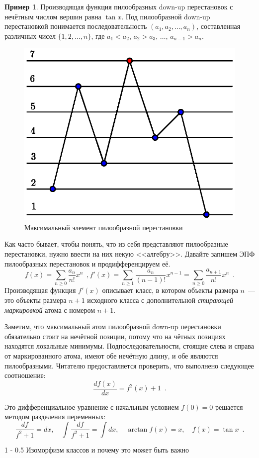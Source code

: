 \documentclass[a5paper]{article}
\makeatletter
\theoremstyle{definition}
\newtheorem{example}{Пример}
\renewcommand{\section}{\@startsection
{section}%
{1}%
{\z@}%
{-\baselineskip}%
{0.5\baselineskip}%
{\centering\large\scshape}} %
\makeatother
\begin{document}
\begin{example}
Производящая функция пилообразных down-up перестановок с нечётным числом вершин 
равна \( \tan x \). Под пилообразной down-up перестановкой понимается 
последовательность \( (a_1, a_2, \ldots, a_n) \), составленная различных чисел 
\( \{ 1, 2, \ldots, n \} \), где \( a_1 < a_2 \), \( a_2 > a_3 \), \( \ldots 
\), \( a_{n-1} > a_n \).

\begin{figure}[h]
\centering
	\includegraphics[width=.42\textwidth]{saw_permutation}
\caption{Максимальный элемент пилообразной перестановки}
\label{fig:saw_permutations}	
\end{figure}
	
Как часто бывает, чтобы понять, что из себя представляют пилообразные 
перестановки, нужно ввести на них некую <<алгебру>>. Давайте запишем ЭПФ 
пилообразных перестановок и продифференцируем её.
\[
	f(x) = \sum_{n \geq 0} \dfrac{a_n}{n!} x^n \enspace ,
	f'(x) = \sum_{n \geq 1} \dfrac{a_n}{(n-1)!} x^{n-1} = \sum_{n \geq 0} 
	\dfrac{a_{n+1}}{n!}x^{n}\enspace .
\]
Производящая функция \( f'(x) \) описывает класс, в котором объекты размера \( 
n \)~--- это объекты размера \( n+1 \) исходного класса с дополнительной 
\textit{стирающей маркировкой} атома с номером \( n+1 \). 

Заметим, что максимальный атом пилообразной down-up перестановки обязательно 
стоит на нечётной позиции, потому что на чётных позициях находятся локальные 
минимумы. Подпоследовательности, стоящие слева и справа от маркированного 
атома, имеют обе нечётную длину, и обе являются пилообразными. Читателю 
предоставляется проверить, что выполнено следующее соотношение:
\[
	\dfrac{df(x)}{dx} = f^2(x) + 1 \enspace .
\]
\end{example}
Это дифференциальное уравнение с начальным условием \( f(0) = 0 \) решается 
методом разделения переменных:
\[
	\dfrac{df}{f^2 + 1} = dx, \quad
	\int \dfrac{df}{f^2 + 1} = \int dx, \quad
	\arctan f(x) = x, \quad
	f(x) = \tan x \enspace .
\]

\section{Изоморфизм классов и почему это может быть важно}
\end{document}
